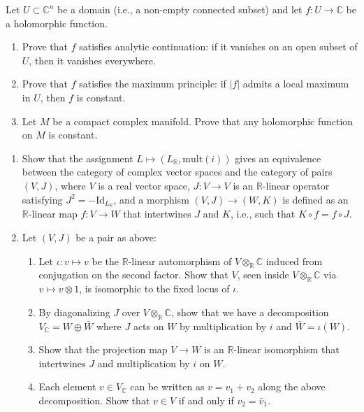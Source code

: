 \documentclass[12pt]{article}
\begin{document}
% 



\begin{problab}{1}
    Let $U \subset \mathbb{C}^n$ be a domain (i.e., a non-empty connected subset) and let $f : U \to \mathbb{C}$ be a holomorphic function.
    \begin{enumerate}
        \item Prove that $f$ satisfies analytic continuation: if it vanishes on an open subset of $U$, then it vanishes everywhere.
        \item Prove that $f$ satisfies the maximum principle: if $|f|$ admits a local maximum in $U$, then $f$ is constant.
        \item Let $M$ be a compact complex manifold. Prove that any holomorphic function on $M$ is constant.
    \end{enumerate}    
\end{problab}
\newpage


\begin{problab}{2}
    \begin{enumerate}
        \item Show that the assignment $L \mapsto (L_{\mathbb{R}}, \text{mult}(i))$ gives an equivalence between the category of complex vector spaces and the category of pairs $(V, J)$, where $V$ is a real vector space, $J : V \to V$ is an $\mathbb{R}$-linear operator satisfying $J^2 = -\mathrm{Id}_{L_\mathbb{R}}$, and a morphism $(V, J) \to (W, K)$ is defined as an $\mathbb{R}$-linear map $f : V \to W$ that intertwines $J$ and $K$, i.e., such that $K \circ f = f \circ J$.

        \item Let $(V, J)$ be a pair as above:
        \begin{enumerate}
            \item Let $\iota : v \mapsto v$ be the $\mathbb{R}$-linear automorphism of $V \otimes_{\mathbb{R}} \mathbb{C}$ induced from conjugation on the second factor. Show that $V$, seen inside $V \otimes_{\mathbb{R}} \mathbb{C}$ via $v \mapsto v \otimes 1$, is isomorphic to the fixed locus of $\iota$.
            \item By diagonalizing $J$ over $V \otimes_{\mathbb{R}} \mathbb{C}$, show that we have a decomposition $V_{\mathbb{C}} = W \oplus \bar{W}$ where $J$ acts on $W$ by multiplication by $i$ and $\bar{W} = \iota(W)$.
            \item Show that the projection map $V \to W$ is an $\mathbb{R}$-linear isomorphism that intertwines $J$ and multiplication by $i$ on $W$.
            \item Each element $v \in V_{\mathbb{C}}$ can be written as $v = v_1 + v_2$ along the above decomposition. Show that $v \in V$ if and only if $v_2 = \bar{v}_1$.
        \end{enumerate}
    \end{enumerate}
\end{problab}
\newpage
\end{document}
